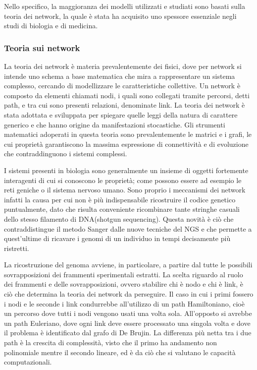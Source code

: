 Nello specifico, la maggioranza dei modelli utilizzati e studiati sono basati sulla teoria dei network, la quale è stata ha acquisito uno spessore essenziale negli studi di biologia e di medicina.

\subsubsection{Teoria sui network}
La teoria dei network è materia prevalentemente dei fisici, dove per network si intende uno schema a base matematica che mira a rappresentare un sistema complesso, cercando di modellizzare le caratteristiche collettive. 
Un network è composto da elementi chiamati nodi, i quali sono collegati tramite percorsi, detti path, e tra cui sono presenti relazioni, denominate link. 
La teoria dei network è stata adottata e sviluppata per spiegare quelle leggi della natura di carattere generico e che hanno origine da manifestazioni stocastiche.
Gli strumenti matematici adoperati in questa teoria sono prevalentemente le matrici e i grafi, le cui proprietà garantiscono la massima espressione di connettività e di evoluzione che contraddinguono i sistemi complessi. 

I sistemi presenti in biologia sono generalmente un insieme di oggetti fortemente interagenti di cui si conoscono le proprietà; come possono essere ad esempio le reti geniche o il sistema nervoso umano.
Sono proprio i meccanismi dei network infatti la causa per cui non è più indispensabile ricostruire il codice genetico puntualmente, dato che risulta conveniente ricombinare tante stringhe casuali dello stesso filamento di DNA(shotgun sequencing).
Questa novità è ciò che contraddistingue il metodo Sanger dalle nuove tecniche del NGS e che permette a quest'ultime di ricavare i genomi di un individuo in tempi decisamente più ristretti.

La ricostruzione del genoma avviene, in particolare, a partire dal tutte le possibili sovrapposizioni dei frammenti sperimentali estratti. 
La scelta riguardo al ruolo dei frammenti e delle sovrapposizioni, ovvero stabilire chi è nodo e chi è link, è ciò che determina la teoria dei network da perseguire.
Il caso in cui i primi fossero i nodi e le seconde i link condurrebbe all'utilizzo di un path Hamiltoniano, cioè un percorso dove tutti i nodi vengono usati una volta sola.
All'opposto si avrebbe un path Euleriano, dove ogni link deve essere processato una singola volta e dove il problema è identificato dal grafo di De Brujin.
La differenza più netta tra i due path è la crescita di complessità, visto che il primo ha andamento non polinomiale mentre il secondo lineare, ed è da ciò che si valutano le capacità computazionali.

